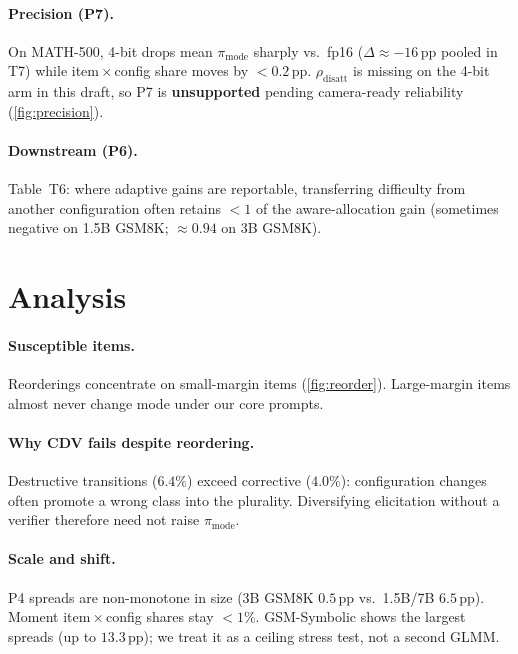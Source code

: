 \documentclass{article}
\newcommand{\pmode}{\pi_{\mathrm{mode}}}
\newcommand{\rdis}{\rho_{\mathrm{disatt}}}
\begin{document}
\paragraph{Precision (P7).}
On MATH-500, 4-bit drops mean $\pmode$ sharply vs.\ fp16
($\Delta\approx -16$\,pp pooled in T7) while item\,$\times$\,config share moves by
${<}0.2$\,pp. $\rdis$ is missing on the 4-bit arm in this draft, so P7 is
\textbf{unsupported} pending camera-ready reliability (\cref{fig:precision}).

\paragraph{Downstream (P6).}
Table~T6: where adaptive gains are reportable, transferring difficulty from
another configuration often retains ${<}1$ of the aware-allocation gain
(sometimes negative on 1.5B GSM8K; $\approx 0.94$ on 3B GSM8K).

\section{Analysis}
\label{sec:analysis}

\paragraph{Susceptible items.}
Reorderings concentrate on small-margin items (\cref{fig:reorder}). Large-margin
items almost never change mode under our core prompts.

\paragraph{Why CDV fails despite reordering.}
Destructive transitions ($6.4\%$) exceed corrective ($4.0\%$): configuration
changes often promote a wrong class into the plurality. Diversifying elicitation
without a verifier therefore need not raise $\pmode$.

\paragraph{Scale and shift.}
P4 spreads are non-monotone in size (3B GSM8K $0.5$\,pp vs.\ 1.5B/7B $6.5$\,pp).
Moment item\,$\times$\,config shares stay ${<}1\%$. GSM-Symbolic shows the
largest spreads (up to $13.3$\,pp); we treat it as a ceiling stress test, not a
second GLMM.
\end{document}
